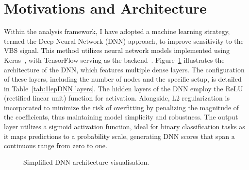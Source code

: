 \section{Motivations and Architecture}
\label{sec:motivations_and_architecture}

Within the analysis framework, I have adopted a machine learning strategy, termed the Deep Neural Network (DNN) approach, to improve sensitivity to the VBS signal. This method utilizes neural network models implemented using Keras~\cite{chollet2015keras}, with TensorFlow serving as the backend~\cite{tensorflow2015-whitepaper}. Figure~\ref{fig:DNNArchitecturePic} illustrates the architecture of the DNN, which features multiple dense layers. The configuration of these layers, including the number of nodes and the specific setup, is detailed in Table~\ref{tab:1lepDNN layers}.
The hidden layers of the DNN employ the ReLU (rectified linear unit) function for activation. Alongside, L2 regularization is incorporated to minimize the risk of overfitting by penalizing the magnitude of the coefficients, thus maintaining model simplicity and robustness. The output layer utilizes a sigmoid activation function, ideal for binary classification tasks as it maps predictions to a probability scale, generating DNN scores that span a continuous range from zero to one.

\begin{figure}[ht]
       \centering
       \caption{Simplified DNN architecture visualisation.}
       \label{fig:DNNArchitecturePic}
\end{figure}

